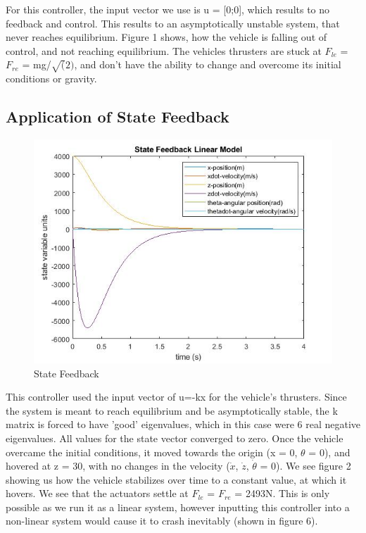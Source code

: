 \documentclass[a4paper,12pt]{article}
\begin{document}
For this controller, the input vector we use is u = [0;0], which results to no feedback and control. This results to an asymptotically unstable system, that never reaches equilibrium. Figure 1 shows, how the vehicle is falling out of control, and not reaching equilibrium. The vehicles thrusters are stuck at  $F_{le}$ = $F_{re}$ = mg/$\sqrt(2)$, and don't have the ability to change and overcome its initial conditions or gravity.

\subsection{Application of State Feedback}
\begin{figure}[H]
	\centering
	\includegraphics[width=.5\linewidth]{Statefeedback.jpg}
	\caption{State Feedback}
\end{figure}
This controller used the input vector of u=-kx for the vehicle's thrusters. Since the system is meant to reach equilibrium and be asymptotically stable, the k matrix is forced to have 'good' eigenvalues, which in this case were 6 real negative eigenvalues. All values for the state vector converged to zero. Once the vehicle overcame the initial conditions, it moved towards the origin (x = 0, $\theta$ = 0), and hovered at z = 30, with no changes in the velocity ($\dot{x}$, $\dot{z}$, $\dot{\theta}$ =  0). We see figure 2 showing us how the vehicle stabilizes over time to a constant value, at which it hovers. We see that the actuators settle at $F_{le}$ = $F_{re}$ = 2493N. This is only possible as we run it as a linear system, however inputting this controller into a non-linear system would cause it to crash inevitably (shown in figure 6).
\end{document}
